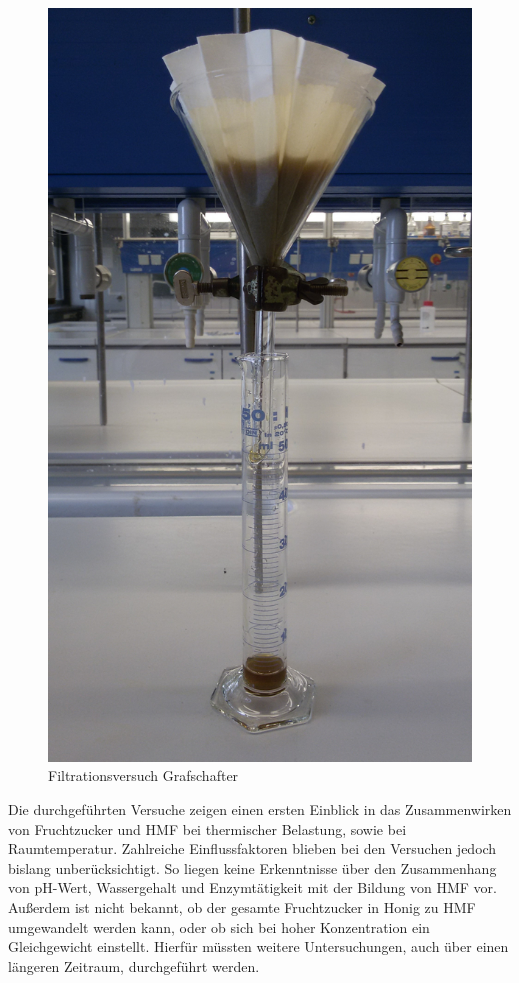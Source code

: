 \begin{figure}[htbp]
	\centering
		\includegraphics[width=1.00\textwidth]{../Bilder/20150427_153416.jpg}
	\caption{Filtrationsversuch Grafschafter}
	\label{fig:Grafschafter}
\end{figure}
Die durchgeführten Versuche zeigen einen ersten Einblick in das Zusammenwirken von Fruchtzucker und HMF bei thermischer Belastung, sowie bei Raumtemperatur. Zahlreiche Einflussfaktoren blieben bei den Versuchen jedoch bislang unberücksichtigt. So liegen keine Erkenntnisse über den Zusammenhang von pH-Wert, Wassergehalt und Enzymtätigkeit mit der Bildung von HMF vor. Außerdem ist nicht bekannt, ob der gesamte Fruchtzucker in Honig zu HMF umgewandelt werden kann, oder ob sich bei hoher Konzentration ein Gleichgewicht einstellt. Hierfür müssten weitere Untersuchungen, auch über einen längeren Zeitraum, durchgeführt werden.
